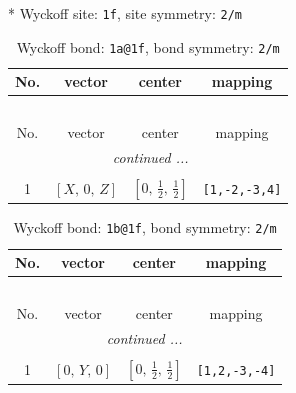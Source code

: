 \documentclass[fleqn,8pt]{jsarticle}
\begin{document}
* Wyckoff site: {\tt 1f}, site symmetry: {\tt 2/m}
\renewcommand{\arraystretch}{1.2}
\begin{longtable}{cccc}
\caption{Wyckoff bond: {\tt 1a@1f}, bond symmetry: {\tt 2/m}}
 \\
 \hline \hline
No. & vector & center & mapping \\ \hline \endfirsthead

\multicolumn{3}{l}{\tablename\ \thetable{}} \\
 \hline \hline
No. & vector & center & mapping \\ \hline \endhead

 \hline \hline
\multicolumn{3}{r}{\footnotesize\it continued ...} \\ \endfoot

 \hline \hline
\multicolumn{3}{r}{} \\ \endlastfoot

1 & $\left[ X,\, 0,\, Z \right]$ & $\left[ 0,\, \frac{1}{2},\, \frac{1}{2} \right]$ & {\tt [1,-2,-3,4]} \\
\end{longtable}
\renewcommand{\arraystretch}{1.2}
\begin{longtable}{cccc}
\caption{Wyckoff bond: {\tt 1b@1f}, bond symmetry: {\tt 2/m}}
 \\
 \hline \hline
No. & vector & center & mapping \\ \hline \endfirsthead

\multicolumn{3}{l}{\tablename\ \thetable{}} \\
 \hline \hline
No. & vector & center & mapping \\ \hline \endhead

 \hline \hline
\multicolumn{3}{r}{\footnotesize\it continued ...} \\ \endfoot

 \hline \hline
\multicolumn{3}{r}{} \\ \endlastfoot

1 & $\left[ 0,\, Y,\, 0 \right]$ & $\left[ 0,\, \frac{1}{2},\, \frac{1}{2} \right]$ & {\tt [1,2,-3,-4]} \\
\end{longtable}
\renewcommand{\arraystretch}{1.2}
\end{document}
